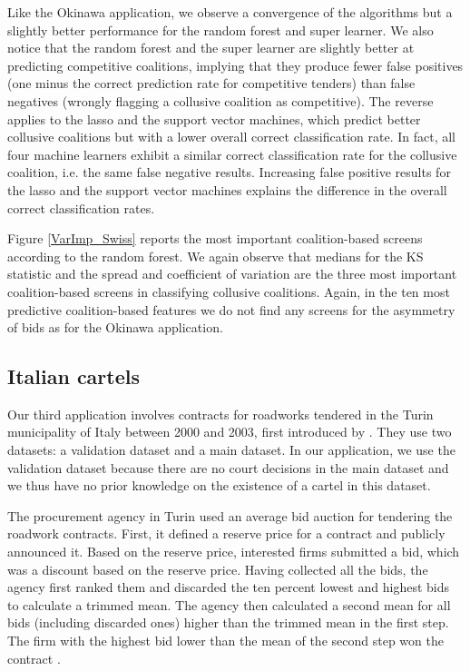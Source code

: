 \documentclass[a4paper,11pt]{article}
\begin{document}
	Like the Okinawa application, we observe a convergence of the algorithms but a slightly better performance for the random forest and super learner. We also notice that the random forest and the super learner are slightly better at predicting competitive coalitions, implying that they produce fewer false positives (one minus the correct prediction rate for competitive tenders) than false negatives (wrongly flagging a collusive coalition as competitive). The reverse applies to the lasso and the support vector machines, which predict better collusive coalitions but with a lower overall correct classification rate. In fact, all four machine learners exhibit a similar correct classification rate for the collusive coalition, i.e. the same false negative results. Increasing false positive results for the lasso and the support vector machines explains the difference in the overall correct classification rates.
	
	Figure \ref{VarImp_Swiss} reports the most important coalition-based screens according to the random forest. We again observe that medians for the KS statistic and the spread and coefficient of variation are the three most important coalition-based screens in classifying collusive coalitions. Again, in the ten most predictive coalition-based features we do not find any screens for the asymmetry of bids as for the Okinawa application.
	
	
	
	\subsection{Italian cartels}
	
	Our third application involves contracts for roadworks tendered in the Turin municipality of Italy between 2000 and 2003, first introduced by \cite{conley2016detecting}. They use two datasets: a validation dataset and a main dataset. In our application, we use the validation dataset because there are no court decisions in the main dataset and we thus have no prior knowledge on the existence of a cartel in this dataset.
	
	The procurement agency in Turin used an average bid auction for tendering the roadwork contracts. First, it defined a reserve price for a contract and publicly announced it. Based on the reserve price, interested firms submitted a bid, which was a discount based on the reserve price. Having collected all the bids, the agency first ranked them and discarded the ten percent lowest and highest bids to calculate a trimmed mean. The agency then calculated a second mean for all bids (including discarded ones) higher than the trimmed mean in the first step. The firm with the highest bid lower than the mean of the second step won the contract \citep[see][for details]{conley2016detecting}. 
	
\end{document}
